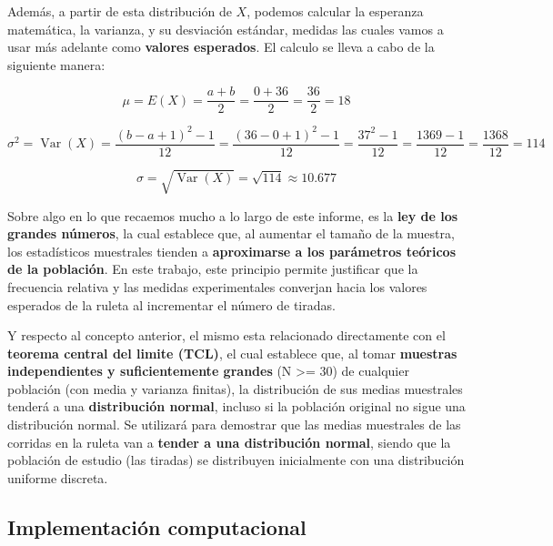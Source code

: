 \documentclass{article}
\begin{document}
Además, a partir de esta distribución de $X$, podemos calcular la esperanza matemática, la varianza, y su desviación estándar, medidas las cuales vamos a usar más adelante como \textbf{valores esperados}. El calculo se lleva a cabo de la siguiente manera:

\begin{equation}
    \mu = E(X) = \frac{a + b}{2} = \frac{0 + 36}{2} = \frac{36}{2} = 18
    \label{eq:media_uniforme}
\end{equation}

\begin{equation}
    \sigma^{2} = \operatorname{Var}(X) = \frac{(b - a + 1)^{2} - 1}{12} = \frac{(36 - 0 + 1)^{2} - 1}{12} = \frac{37^{2} - 1}{12} = \frac{1369 - 1}{12} = \frac{1368}{12} = 114
    \label{eq:varianza_uniforme}
\end{equation}

\begin{equation}
    \sigma = \sqrt{\operatorname{Var}(X)} = \sqrt{114} \approx 10.677
    \label{eq:desvio_uniforme}
\end{equation}

Sobre algo en lo que recaemos mucho a lo largo de este informe, es la \textbf{ley de los grandes números}, la cual establece que, al aumentar el tamaño de la muestra, los estadísticos muestrales tienden a \textbf{aproximarse a los parámetros teóricos de la población}. En este trabajo, este principio permite justificar que la frecuencia relativa y las medidas experimentales converjan hacia los valores esperados de la ruleta al incrementar el número de tiradas.

Y respecto al concepto anterior, el mismo esta relacionado directamente con el \textbf{teorema central del limite (TCL)}, el cual establece que, al tomar \textbf{muestras independientes y suficientemente grandes} (N >= 30) de cualquier población (con media y varianza finitas), la distribución de sus medias muestrales tenderá a una \textbf{distribución normal}, incluso si la población original no sigue una distribución normal. Se utilizará para demostrar que las medias muestrales de las corridas en la ruleta van a \textbf{tender a una distribución normal}, siendo que la población de estudio (las tiradas) se distribuyen inicialmente con una distribución uniforme discreta.

\subsection{Implementación computacional}
\end{document}

